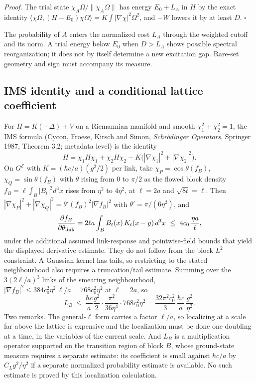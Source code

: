\documentclass[11pt,a4paper]{article}
\begin{document}
\emph{Proof.} The trial state \(\chi_A\Omega/\|\chi_A\Omega\|\) has
energy \(E_0+L_A\) in \(H\) by the exact identity
\(\langle\chi\Omega,(H-E_0)\chi\Omega\rangle=K\int|\nabla\chi|^2\Omega^2\),
and \(-W\) lowers it by at least \(D\). \(\square\)

The probability of \(A\) enters the normalized cost \(L_A\) through the
weighted cutoff and its norm. A trial energy below \(E_0\) when
\(D>L_A\) shows possible spectral reorganization; it does not by itself
determine a new excitation gap. Rare-set geometry and sign must
accompany its measure.

\hypertarget{ims-identity-and-a-conditional-lattice-coefficient}{%
\subsection{IMS identity and a conditional lattice
coefficient}\label{ims-identity-and-a-conditional-lattice-coefficient}}

For \(H=K(-\Delta)+V\) on a Riemannian manifold and smooth
\(\chi_1^2+\chi_2^2=1\), the IMS formula (Cycon, Froese, Kirsch and
Simon, \emph{Schrödinger Operators}, Springer 1987, Theorem 3.2;
metadata level) is the identity
\[H=\chi_1H\chi_1+\chi_2H\chi_2-K\big(|\nabla\chi_1|^2+|\nabla\chi_2|^2\big).\]
On \(G^{\mathcal E}\) with \(K=(\hbar c/a)(g^2/2)\) per link, take
\(\chi_P=\cos\theta(f_B)\), \(\chi_Q=\sin\theta(f_B)\) with \(\theta\)
rising from \(0\) to \(\pi/2\) as the flowed block density
\(f_B=\ell\int_B|B_t|^2d^3x\) rises from \(\eta^2\) to \(4\eta^2\), at
\(\ell=2a\) and \(\sqrt{8t}=\ell\). Then
\(|\nabla\chi_P|^2+|\nabla\chi_Q|^2=\theta'(f_B)^2|\nabla f_B|^2\) with
\(\theta'=\pi/(6\eta^2)\), and
\[\frac{\partial f_B}{\partial\theta_{\rm link}}=2\ell a\int_BB_t(x)\,K_t(x-y)\,d^3x\ \le\ 4c_0\,\frac{\eta a}{\ell},\]
under the additional assumed link-response and pointwise-field bounds
that yield the displayed derivative estimate. They do not follow from
the block \(L^2\) constraint. A Gaussian kernel has tails, so
restricting to the stated neighbourhood also requires a truncation/tail
estimate. Summing over the \(3(2\ell/a)^3\) links of the smearing
neighbourhood,
\(|\nabla f_B|^2\le384c_0^2\eta^2\,\ell/a=768c_0^2\eta^2\) at
\(\ell=2a\), so
\[L_B\ \le\ \frac{\hbar c}{a}\frac{g^2}2\cdot\frac{\pi^2}{36\eta^4}\cdot768c_0^2\eta^2
=\frac{32\pi^2c_0^2}{3}\,\frac{\hbar c}{a}\,\frac{g^2}{\eta^2}.\] Two
remarks. The general-\(\ell\) form carries a factor \(\ell/a\), so
localizing at a scale far above the lattice is expensive and the
localization must be done one doubling at a time, in the variables of
the current scale. And \(L_B\) is a multiplication operator supported on
the transition region of block \(B\), whose ground-state measure
requires a separate estimate: its coefficient is small against
\(\hbar c/a\) by \(C_Lg^2/\eta^2\) if a separate normalized probability
estimate is available. No such estimate is proved by this localization
calculation.
\end{document}
